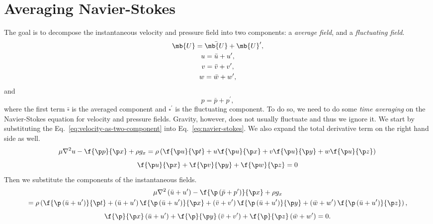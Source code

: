 \section{Averaging Navier-Stokes}

The goal is to decompose the instantaneous velocity and pressure field into two components: a \emph{average field},
and a \emph{fluctuating field}.
%
\begin{equation}
  \begin{gathered}
  \mb{U} = \bar{\mb{U}} + \mb{U}^\prime, \\
  u = \bar{u} + u^\prime, \\
  v = \bar{v} + v^\prime, \\
  w = \bar{w} + w^\prime,
  \end{gathered}
  \label{eq:velocity-as-two-component}
\end{equation}
%
and
%
\begin{equation}
  p = \bar{p} + p^\prime,
  \label{eq:pressure-as-two-component}
\end{equation}
%
where the first term \(\bar{\square}\) is the averaged component and \(\square^\prime\) is the fluctuating component.
To do so, we need to do some \emph{time averaging} on the Navier-Stokes equation for velocity and pressure fields.
Gravity, however, does not usually fluctuate and thus we ignore it.
We start by substituting the Eq.~\ref{eq:velocity-as-two-component} into Eq.~\ref{eq:navier-stokes}.
We also expand the total derivative term on the right hand side as well.
%
\begin{equation}
    \mu \nabla^2 u - \f{\p p}{\p x} + \rho g_x
    = \rho \left(\f{\p u}{\p t} + u \f{\p u}{\p x} + v \f{\p u}{\p y} + w \f{\p u}{\p z} \right) \\
  \label{eq:NS-time-avg-x-comp}
\end{equation}
\begin{equation}
    \f{\p u}{\p x} + \f{\p v}{\p y} + \f{\p w}{\p z} = 0
  \label{eq:continuity-avg-x-comp}
\end{equation}
%
Then we substitute the components of the instantaneous fields.
%
\begin{multline}
    \mu \nabla^2 \left(\bar{u} + u^\prime\right) - \f{\p \left(\bar{p} + p^\prime\right)}{\p x} + \rho g_x \\
    = \rho \left(\f{\p \left(\bar{u} + u^\prime\right)}{\p t} + \left(\bar{u} + u^\prime\right) \f{\p \left(\bar{u} + u^\prime\right)}{\p x} + \left(\bar{v} + v^\prime\right) \f{\p \left(\bar{u} + u^\prime\right)}{\p y} + \left(\bar{w} + w^\prime\right) \f{\p \left(\bar{u} + u^\prime\right)}{\p z} \right),
  \label{eq:NS-time-avg-subst-comp}
\end{multline}
\begin{equation}
  \f{\p}{\p x}\left(\bar{u} + u^\prime\right)
  + \f{\p}{\p y}\left(\bar{v} + v^\prime\right)
  + \f{\p}{\p z}\left(\bar{w} + w^\prime\right) = 0.
\label{eq:continuity-avg-subst-comp}
\end{equation}



